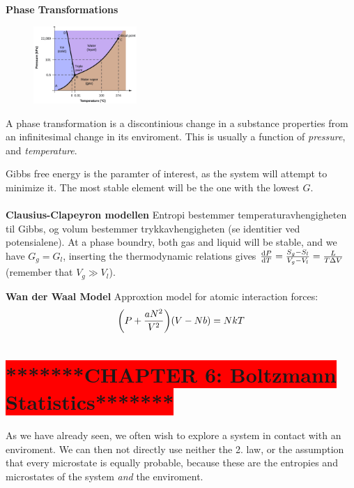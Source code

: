 \documentclass[8pt, a4paper]{extarticle}
\newcommand{\rdd}{\colorbox{lightred}}
\begin{document}
\begin{twocolumn}
\rdd{\textbf{Phase Transformations}}

\begin{figure}
    \centering
    \includegraphics[width=0.35\textwidth]{figs/fig5.jpg}
\end{figure}

A phase transformation is a discontinious change in a substance properties from an infinitesimal change in its enviroment. This is usually a function of \textit{pressure}, and \textit{temperature}.

Gibbs free energy is the paramter of interest, as the system will attempt to minimize it. The most stable element will be the one with the lowest $G$.
\\
\\
\rdd{\textbf{Clausius-Clapeyron modellen}}
Entropi bestemmer temperaturavhengigheten til Gibbs, og volum bestemmer trykkavhengigheten (se identitier ved potensialene). At a phase boundry, both gas and liquid will be stable, and we have $G_g = G_l$, inserting the thermodynamic relations gives
$\dv{P}{T} = \frac{S_g - S_l}{V_g - V_l} = \frac{L}{T\Delta V}$ (remember that $V_g \gg V_l$).


\rdd{\textbf{Wan der Waal Model}}
Approxtion model for atomic interaction forces:
$$
    \qty(P + \frac{aN^2}{V^2})\qty(V - Nb) = NkT
$$



\section*{\colorbox{red}{*******CHAPTER 6: Boltzmann Statistics*******}}
As we have already seen, we often wish to explore a system in contact with an enviroment. We can then not directly use neither the 2. law, or the assumption that every microstate is equally probable, because these are the entropies and microstates of the system \textit{and} the enviroment.


\end{twocolumn}
\end{document}

